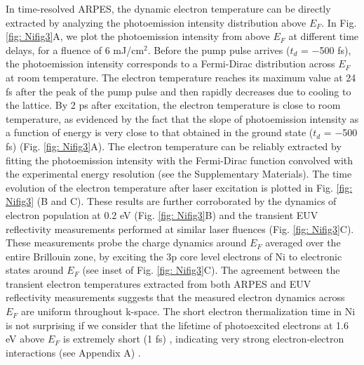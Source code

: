 In time-resolved ARPES, the dynamic electron temperature can be directly extracted by analyzing the photoemission intensity distribution above $E_{F}$. In Fig. 	\ref{fig: Nifig3}A, we plot the photoemission intensity from above $E_{F}$ at different time delays, for a fluence of 6 mJ/cm$^2$. Before the pump pulse arrives ($t_{d}$ = −500 fs), the photoemission intensity corresponds to a Fermi-Dirac distribution across $E_{F}$ at room temperature. The electron temperature reaches its maximum value at 24 fs after the peak of the pump pulse and then rapidly decreases due to cooling to the lattice. By 2 ps after excitation, the electron temperature is close to room temperature, as evidenced by the fact that the slope of photoemission intensity as a function of energy is very close to that obtained in the ground state ($t_d$ = −500 fs) (Fig. \ref{fig: Nifig3}A). The electron temperature can be reliably extracted by fitting the photoemission intensity with the Fermi-Dirac function convolved with the experimental energy resolution (see the Supplementary Materials). The time evolution of the electron temperature after laser excitation is plotted in Fig. \ref{fig: Nifig3} (B and C). These results are further corroborated by the dynamics of electron population at 0.2 eV (Fig. \ref{fig: Nifig3}B) and the transient EUV reflectivity measurements performed at similar laser fluences (Fig. \ref{fig: Nifig3}C). These measurements probe the charge dynamics around $E_{F}$ averaged over the entire Brillouin zone, by exciting the 3p core level electrons of Ni to electronic states around $E_{F}$ (see inset of Fig. \ref{fig: Nifig3}C). The agreement between the transient electron temperatures extracted from both ARPES and EUV reflectivity measurements suggests that the measured electron dynamics across $E_{F}$ are uniform throughout k-space. The short electron thermalization time in Ni is not surprising if we consider that the lifetime of photoexcited electrons at 1.6 eV above $E_{F}$ is extremely short (1 fs) \cite{Knorren2000}, indicating very strong electron-electron interactions (see Appendix A) \cite{Chen2017}. 
